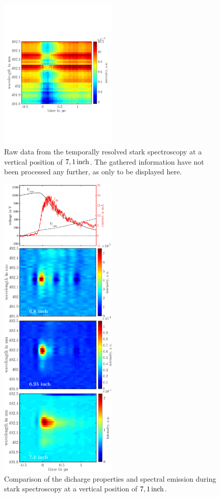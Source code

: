 \documentclass[a4paper,10pt,twoside]{article}
\begin{document}
				\begin{figure}
					\centering
					\includegraphics[width=0.5\textwidth]{figures/stark/stark_71inraw.pdf}
					\caption{Raw data from the temporally resolved stark spectroscopy at a vertical position of $\unit[7,1]{inch}$. The gathered information have not been processed any further, as only to be displayed here.}
				\end{figure}

				\begin{figure}
					\centering
					\includegraphics[width=0.5\textwidth]{figures/stark/combinations/starkallheightscombination.pdf}
					\caption{Comparison of the dicharge properties and spectral emission during stark spectroscopy at a vertical position of $\unit[7,1]{inch}$. }
					\label{img:stark71comparison}
				\end{figure}
\end{document}
